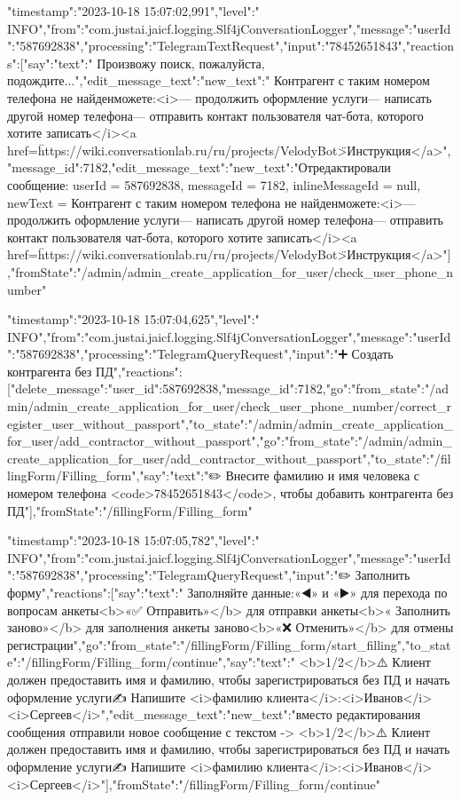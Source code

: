 \documentclass{article}
\begin{document}
\item{
{"timestamp":"2023-10-18 15:07:02,991","level":" INFO","from":"com.justai.jaicf.logging.Slf4jConversationLogger","message":{"userId":"587692838","processing":"TelegramTextRequest","input":"78452651843","reactions":[{"say":{"text":" Произвожу поиск, пожалуйста, подождите..."}},{"edit_message_text":{"new_text":" Контрагент с таким номером телефона не найден\n{} можете:\n<i>— продолжить оформление услуги\n— написать другой номер телефона\n— отправить контакт пользователя чат-бота, которого хотите записать</i>\n\n <a href=\"https://wiki.conversationlab.ru/ru/projects/VelodyBot\">Инструкция</a>","message_id":7182}},{"edit_message_text":{"new_text":"Отредактировали сообщение: userId = 587692838, messageId = 7182, inlineMessageId = null, newText =  Контрагент с таким номером телефона не найден\n{} можете:\n<i>— продолжить оформление услуги\n— написать другой номер телефона\n— отправить контакт пользователя чат-бота, которого хотите записать</i>\n\n <a href=\"https://wiki.conversationlab.ru/ru/projects/VelodyBot\">Инструкция</a>"}}],"fromState":"/admin/admin_create_application_for_user/check_user_phone_number"}}
}

\item{
{"timestamp":"2023-10-18 15:07:04,625","level":" INFO","from":"com.justai.jaicf.logging.Slf4jConversationLogger","message":{"userId":"587692838","processing":"TelegramQueryRequest","input":"➕ Создать контрагента без ПД","reactions":[{"delete_message":{"user_id":587692838,"message_id":7182}},{"go":{"from_state":"/admin/admin_create_application_for_user/check_user_phone_number/correct_register_user_without_passport","to_state":"/admin/admin_create_application_for_user/add_contractor_without_passport"}},{"go":{"from_state":"/admin/admin_create_application_for_user/add_contractor_without_passport","to_state":"/fillingForm/Filling_form"}},{"say":{"text":"✏️ Внесите фамилию и имя человека с номером телефона <code>78452651843</code>, чтобы добавить контрагента без ПД"}}],"fromState":"/fillingForm/Filling_form"}}
}

\item{
{"timestamp":"2023-10-18 15:07:05,782","level":" INFO","from":"com.justai.jaicf.logging.Slf4jConversationLogger","message":{"userId":"587692838","processing":"TelegramQueryRequest","input":"✏️ Заполнить форму","reactions":[{"say":{"text":" Заполняйте данные\n{}:\n\n«◀️» и «▶️» для перехода по вопросам анкеты\n<b>«✅ Отправить»</b> для отправки анкеты\n<b>« Заполнить заново»</b> для заполнения анкеты заново\n<b>«❌ Отменить»</b> для отмены регистрации"}},{"go":{"from_state":"/fillingForm/Filling_form/start_filling","to_state":"/fillingForm/Filling_form/continue"}},{"say":{"text":" <b>1/2</b>\n\n⚠️ Клиент должен предоставить имя и фамилию, чтобы зарегистрироваться без ПД и начать оформление услуги\n\n✍️ Напишите <i>фамилию клиента</i>\n{}:\n\n<i>Иванов</i>\n<i>Сергеев</i>"}},{"edit_message_text":{"new_text":"вместо редактирования сообщения отправили новое сообщение с текстом ->  <b>1/2</b>\n\n⚠️ Клиент должен предоставить имя и фамилию, чтобы зарегистрироваться без ПД и начать оформление услуги\n\n✍️ Напишите <i>фамилию клиента</i>\n{}:\n\n<i>Иванов</i>\n<i>Сергеев</i>"}}],"fromState":"/fillingForm/Filling_form/continue"}}
}
\end{document}
